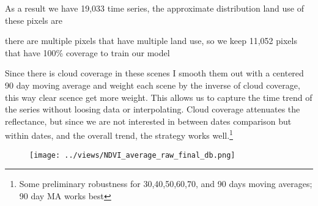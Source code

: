 \documentclass[10pt,a4paper,onecolumn]{article}
\begin{document}
As a result we have 19,033 time series, the approximate distribution land use of these pixels are






there are multiple pixels that have multiple land use, so we keep 11,052  pixels that have 100\% coverage to train our model




Since there is cloud coverage in these scenes I smooth them out with a centered 90 day moving average and weight each scene by the inverse of cloud coverage, this way clear scence get more weight. This allows us to capture the time trend of the series without loosing data or interpolating. Cloud coverage attenuates the reflectance, but since we are not interested in between dates comparison but within dates, and the overall trend, the strategy works well.\footnote{Some preliminary robustness for 30,40,50,60,70, and 90 days moving averages; 90 day MA works best}







 



              


  
\begin{figure}[H] \centering
            \captionsetup{justification=centering}
              \texttt{[image: ../views/NDVI\_average\_raw\_final\_db.png]}
              
 \end{figure}
\end{document}
